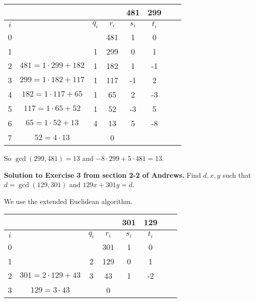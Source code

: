 \documentclass[oneside,12pt]{amsart}
\begin{document}
\begin{tabular}{|c|c|c|c|c|c|c|c|}
\hline
\quad & \quad                   & \quad   & \quad & 481    & 299   \\ \hline
$i$   & \quad                   & $q_{i}$ & $r_i$ & $s_i$  & $t_i$ \\ \hline\hline
0     & \quad                   & \quad   & 481   &  1     & 0     \\ \hline
1     & \quad                   &  1      & 299   &  0     & 1     \\ \hline
2     & $481=1\cdot 299 + 182$  &  1      & 182   &  1     &-1     \\ \hline
3     & $299=1\cdot 182 + 117$  &  1      & 117   & -1     & 2     \\ \hline
4     & $182=1\cdot 117 + 65$   &  1      &  65   &  2     &-3     \\ \hline
5     & $117=1\cdot 65 + 52$    &  1      &  52   & -3     & 5     \\ \hline
6     & $65 =1\cdot 52 + 13$    &  4      &  13   &  5     &-8     \\ \hline
7     & $52 =4\cdot 13$         &         &   0   &        &       \\ \hline
\end{tabular}

So $\gcd(299,481) = 13$ and $-8\cdot 299 + 5\cdot 481 = 13$.

\bigskip


\textbf{Solution to Exercise 3 from section 2-2 of Andrews.} Find
$d,x,y$ such that $d=\gcd(129,301)$ and $129x + 301y = d$.

\bigskip

We use the extended Euclidean algorithm.

\begin{tabular}{|c|c|c|c|c|c|c|c|}
\hline
\quad & \quad                    & \quad   & \quad & 301    & 129   \\ \hline
$i$   & \quad                    & $q_{i}$ & $r_i$ & $s_i$  & $t_i$ \\ \hline\hline
0     & \quad                    & \quad   & 301   &  1     & 0     \\ \hline
1     & \quad                    &  2      & 129   &  0     & 1     \\ \hline
2     & $301 = 2 \cdot 129 + 43$ &  3      &  43   &  1     & -2    \\ \hline
3     & $129=3\cdot 43$          &         &   0   &        &       \\ \hline
\end{tabular}
\end{document}
